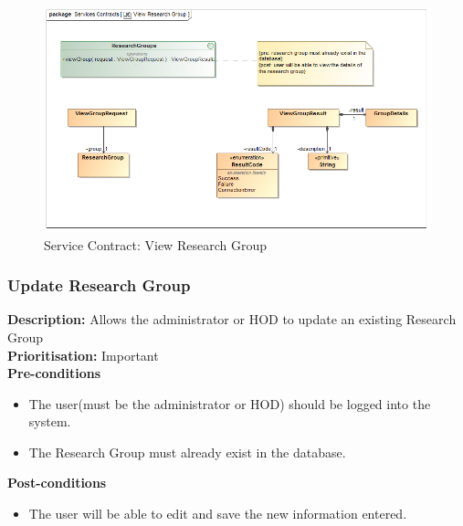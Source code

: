 \documentclass[a4paper]{article}
\begin{document}
    	    	\begin{figure}[H]
    	    		\centering
    	    		\includegraphics[width=\textwidth]{../Assignment1/5.1.12.View.Research.Group.Services.Contract.png}
    	    		\caption{Service Contract: View Research Group}
    	    	\end{figure}
    	
    	\pagebreak
    \subsubsection{Update Research Group}
    	\textbf{Description:} Allows the administrator or HOD to update an existing Research Group\\
    	\textbf{Prioritisation:} Important\\
    	
    	\textbf{Pre-conditions}
    	 \begin{itemize}
    		\item The user(must be the administrator or HOD) should be logged into the system.
    		\item The Research Group must already exist in the database.
    	\end{itemize}
    	
    	\textbf{Post-conditions}
    	 \begin{itemize}
    		\item The user will be able to edit and save the new information entered.
    	\end{itemize}
    	
\end{document}
